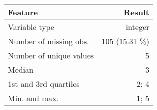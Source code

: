 \documentclass[]{article}
\begin{document}
\begin{longtable}[]{@{}lr@{}}
\toprule
\begin{minipage}[b]{0.34\columnwidth}\raggedright\strut
Feature\strut
\end{minipage} & \begin{minipage}[b]{0.20\columnwidth}\raggedleft\strut
Result\strut
\end{minipage}\tabularnewline
\midrule
\endhead
\begin{minipage}[t]{0.34\columnwidth}\raggedright\strut
Variable type\strut
\end{minipage} & \begin{minipage}[t]{0.20\columnwidth}\raggedleft\strut
integer\strut
\end{minipage}\tabularnewline
\begin{minipage}[t]{0.34\columnwidth}\raggedright\strut
Number of missing obs.\strut
\end{minipage} & \begin{minipage}[t]{0.20\columnwidth}\raggedleft\strut
105 (15.31 \%)\strut
\end{minipage}\tabularnewline
\begin{minipage}[t]{0.34\columnwidth}\raggedright\strut
Number of unique values\strut
\end{minipage} & \begin{minipage}[t]{0.20\columnwidth}\raggedleft\strut
5\strut
\end{minipage}\tabularnewline
\begin{minipage}[t]{0.34\columnwidth}\raggedright\strut
Median\strut
\end{minipage} & \begin{minipage}[t]{0.20\columnwidth}\raggedleft\strut
3\strut
\end{minipage}\tabularnewline
\begin{minipage}[t]{0.34\columnwidth}\raggedright\strut
1st and 3rd quartiles\strut
\end{minipage} & \begin{minipage}[t]{0.20\columnwidth}\raggedleft\strut
2; 4\strut
\end{minipage}\tabularnewline
\begin{minipage}[t]{0.34\columnwidth}\raggedright\strut
Min. and max.\strut
\end{minipage} & \begin{minipage}[t]{0.20\columnwidth}\raggedleft\strut
1; 5\strut
\end{minipage}\tabularnewline
\bottomrule
\end{longtable}
\end{document}
